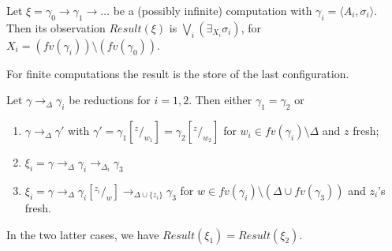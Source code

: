 \documentclass{llncs}
\begin{document}
\begin{definition}[Observables]\label{def:observables}
Let $\xi = \gamma_0  \rightarrow \gamma_1  \rightarrow \dots$ be a (possibly infinite) computation with $\gamma_i = \langle A_i, \sigma_i\rangle$.
%
Then its observation $\mathit{Result}(\xi)$ 
is $\bigvee_i (\exists_{X_i} \sigma_i)$, for $X_i = (fv(\gamma_i))\setminus(fv(\gamma_0))$.
\end{definition}

For finite computations the result is the store of the last configuration.

\begin{proposition}\label{lemma:upto}
Let $\gamma \rightarrow_\Delta \gamma_i$ be reductions for $i =  1, 2$.
Then either $\gamma_1 = \gamma_2$ or 
\begin{enumerate}
\item $\gamma \rightarrow_\Delta  \gamma'$ with 
$\gamma' = \gamma_1[^z/_{w_1}] =  \gamma_2[^z/_{w_2}]$
for $w_i \in fv(\gamma_i) \setminus \Delta$ and $z$ fresh;
\item
$\xi_i = \gamma \rightarrow_\Delta \gamma_i \rightarrow_{\Delta_i} \gamma_3$
\item
$\xi_i = \gamma \rightarrow_\Delta \gamma_i[^{z_i}/_w] \rightarrow_{\Delta \cup \{z_i\}} \gamma_3$
for $w \in fv(\gamma_i) \setminus (\Delta \cup fv(\gamma_3))$ and $z_i$'s fresh.
\end{enumerate}
In the two latter cases, we have $Result(\xi_1) = Result(\xi_2)$.
\end{proposition}
\end{document}

